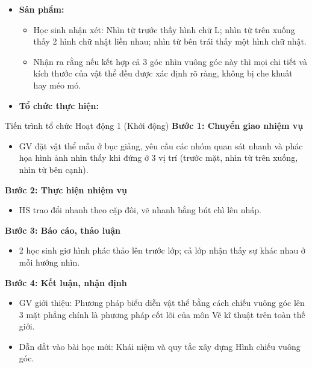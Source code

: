 \documentclass[12pt, a4paper]{article}
\begin{document}
\begin{itemize}[leftmargin=1.2cm]
    \item[c)] \textbf{Sản phẩm:}
    \begin{itemize}[leftmargin=0.6cm]
        \item Học sinh nhận xét: Nhìn từ trước thấy hình chữ L; nhìn từ trên xuống thấy 2 hình chữ nhật liền nhau; nhìn từ bên trái thấy một hình chữ nhật.
        \item Nhận ra rằng nếu kết hợp cả 3 góc nhìn vuông góc này thì mọi chi tiết và kích thước của vật thể đều được xác định rõ ràng, không bị che khuất hay méo mó.
    \end{itemize}

    \item[d)] \textbf{Tổ chức thực hiện:}
\end{itemize}

\begin{pedabox}{Tiến trình tổ chức Hoạt động 1 (Khởi động)}
    \textbf{Bước 1: Chuyển giao nhiệm vụ}
    \begin{itemize}[leftmargin=0.6cm]
        \item GV đặt vật thể mẫu ở bục giảng, yêu cầu các nhóm quan sát nhanh và phác họa hình ảnh nhìn thấy khi đứng ở 3 vị trí (trước mặt, nhìn từ trên xuống, nhìn từ bên cạnh).
    \end{itemize}

    \textbf{Bước 2: Thực hiện nhiệm vụ}
    \begin{itemize}[leftmargin=0.6cm]
        \item HS trao đổi nhanh theo cặp đôi, vẽ nhanh bằng bút chì lên nháp.
    \end{itemize}

    \textbf{Bước 3: Báo cáo, thảo luận}
    \begin{itemize}[leftmargin=0.6cm]
        \item 2 học sinh giơ hình phác thảo lên trước lớp; cả lớp nhận thấy sự khác nhau ở mỗi hướng nhìn.
    \end{itemize}

    \textbf{Bước 4: Kết luận, nhận định}
    \begin{itemize}[leftmargin=0.6cm]
        \item GV giới thiệu: Phương pháp biểu diễn vật thể bằng cách chiếu vuông góc lên 3 mặt phẳng chính là phương pháp cốt lõi của môn Vẽ kĩ thuật trên toàn thế giới.
        \item Dẫn dắt vào bài học mới: Khái niệm và quy tắc xây dựng Hình chiếu vuông góc.
    \end{itemize}
\end{pedabox}
\end{document}
